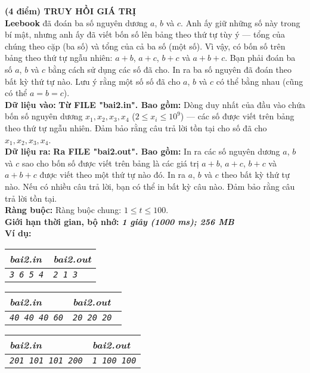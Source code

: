 \begin{ex}
	\textbf{(4 điểm) TRUY HỒI GIÁ TRỊ}\\
	\textbf{Leebook} đã đoán ba số nguyên dương $a$, $b$ và $c$. Anh ấy giữ những số này trong bí mật, nhưng anh ấy đã viết bốn số lên bảng theo thứ tự tùy ý — tổng của chúng theo cặp (ba số) và tổng của cả ba số (một số). Vì vậy, có bốn số trên bảng theo thứ tự ngẫu nhiên: $a+b$, $a+c$, $b+c$ và $a+b+c$. Bạn phải đoán ba số $a$, $b$ và $c$ bằng cách sử dụng các số đã cho. In ra ba số nguyên đã đoán theo bất kỳ thứ tự nào. Lưu ý rằng một số số đã cho $a$, $b$ và $c$ có thể bằng nhau (cũng có thể $a=b=c$).\\
	\textbf{Dữ liệu vào: }\textbf{Từ FILE "bai2.in". Bao gồm: }
	Dòng duy nhất của đầu vào chứa bốn số nguyên dương $x_1, x_2, x_3, x_4$ ($2 \le x_i \le 10^9$) — các số được viết trên bảng theo thứ tự ngẫu nhiên. Đảm bảo rằng câu trả lời tồn tại cho số đã cho $x_1, x_2, x_3, x_4$.\\
	\textbf{Dữ liệu ra: }\textbf{Ra FILE "bai2.out". Bao gồm: }In ra các số nguyên dương $a$, $b$ và $c$ sao cho bốn số được viết trên bảng là các giá trị $a+b$, $a+c$, $b+c$ và $a+b+c$ được viết theo một thứ tự nào đó. In ra $a$, $b$ và $c$ theo bất kỳ thứ tự nào. Nếu có nhiều câu trả lời, bạn có thể in bất kỳ câu nào. Đảm bảo rằng câu trả lời tồn tại.\\
	\textbf{Ràng buộc: } Ràng buộc chung: $1 \leq t \leq 100$.\\
	\textbf{Giới hạn thời gian, bộ nhớ: } \textbf{\textit{1 giây (1000 ms); 256 MB}} \\
	\textbf{Ví dụ: }
	\begin{center}
		\begin{multicols}{3}
			\begin{tabular}{|l|l|}
				\hline
				\textit{\textbf{\textsf{bai2.in}}} & \textit{\textbf{\textsf{bai2.out}}} \\ %
				\hline
				\textit{\texttt{3 6 5 4}}          & \textit{\texttt{2 1 3}}             \\
				\hline
			\end{tabular}
			\vfil\null \columnbreak
			\begin{tabular}{|l|l|}
				\hline
				\textit{\textbf{\textsf{bai2.in}}} & \textit{\textbf{\textsf{bai2.out}}} \\ %
				\hline
				\textit{\texttt{40 40 40 60}}      & \textit{\texttt{20 20 20 }}         \\
				\hline
			\end{tabular}
			\vfil\null \columnbreak
			\begin{tabular}{|l|l|}
				\hline
				\textit{\textbf{\textsf{bai2.in}}} & \textit{\textbf{\textsf{bai2.out}}} \\ %
				\hline
				\textit{\texttt{201 101 101 200}}  & \textit{\texttt{1 100 100}}         \\
				\hline
			\end{tabular}
		\end{multicols}
	\end{center}
\end{ex}

